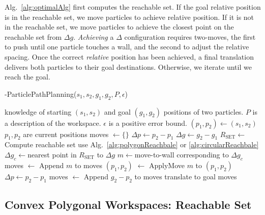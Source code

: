  Alg.~\ref{alg:optimalAlg} first computes the reachable set. If the goal relative position is in the reachable set, we move particles to achieve relative position. If it is not in the reachable set, we move particles to achieve the closest point on the reachable set from $\Delta g$. 
 \emph{Achieving} a $\Delta$ configuration requires two-moves, the first to push until one particle touches a wall, and the second to adjust the relative spacing.
 Once the correct \emph{relative} position has been achieved, a final translation delivers both particles to their goal destinations. %
 Otherwise, we iterate until we reach the goal. 
\begin{algorithm}[htb]
\caption{ { -ParticlePathPlanning}($s_1,s_2,g_1,g_2,P,\epsilon$)}\label{alg:optimalAlg}
\begin{algorithmic}[1]
\Require knowledge of starting $(s_1,s_2)$ and goal $(g_1,g_2)$ positions of  two particles. 
 $P$ is a description of the workspace. $\epsilon$ is a positive error bound.
 \State $(p_1,p_2) \gets (s_1,s_2) $ \Comment $p_1 , p_2$ are current positions
\State  moves $\gets \{\}$
 \State $\Delta p \gets p_2-p_1$
 \State $\Delta g \gets g_2-g_1$
\State $R_{\textrm{SET}}\gets$  Compute reachable set  \Comment use Alg.~\ref{alg:polygonReachbale} or \ref{alg:circularReachbale}
\State $ \Delta g_c\gets $nearest point in $R_{\textrm{SET}}$ to $\Delta g$
\State $m \gets $move-to-wall corresponding to $\Delta g_c$
\State moves $\gets$ Append $m$ to moves
\State $(p_1, p_2)$ $\gets$ ApplyMove $m$ to $(p_1,p_2)$
 \State $\Delta p \gets p_2-p_1$
\EndWhile
\State moves $\gets$ Append $g_2-p_2$ to moves \Comment translate to goal
\State \Return moves
\end{algorithmic}
\end{algorithm}


\subsection{Convex Polygonal Workspaces: Reachable Set}
 
